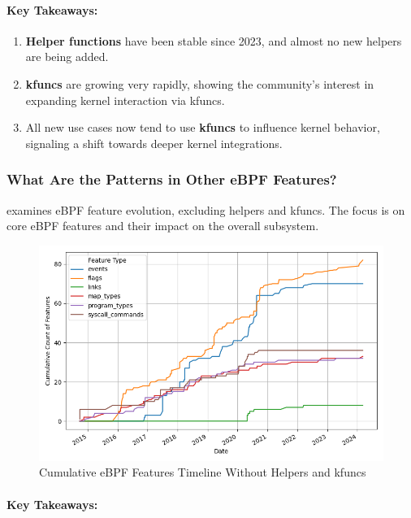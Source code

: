 \paragraph{Key Takeaways:}

\begin{enumerate}
    \item \textbf{Helper functions} have been stable since 2023, and almost no new helpers are being added.
    \item \textbf{kfuncs} are growing very rapidly, showing the community's interest in expanding kernel interaction via kfuncs.
    \item All new use cases now tend to use \textbf{kfuncs} to influence kernel behavior, signaling a shift towards deeper kernel integrations.
\end{enumerate}

\subsubsection{What Are the Patterns in Other eBPF Features?}

 examines eBPF feature evolution, excluding helpers and kfuncs. The focus is on core eBPF features and their impact on the overall subsystem.

\begin{figure}[ht]
    \centering
    \includegraphics[width=\linewidth]{feature-analysis/cumulative_bpf_features_timeline_no_helper_kfunc.png}
    \caption{Cumulative eBPF Features Timeline Without Helpers and kfuncs}
    \label{fig:cumulative_without_helper_timeline}
\end{figure}

\paragraph{Key Takeaways:}

